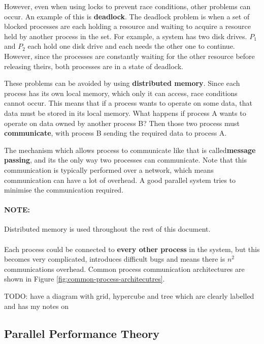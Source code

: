 \documentclass{article}
\begin{document}
However, even when using locks to prevent race conditions, other problems can occur. An example of this is \textbf{deadlock}. The deadlock problem is when a set of blocked processes are each holding a resource and waiting to acquire a resource held by another process in the set. For example, a system has two disk drives. $P_1$ and $P_2$ each hold one disk drive and each needs the other one to continue. However, since the processes are constantly waiting for the other resource before releasing theirs, both processes are in a state of deadlock.

These problems can be avoided by using \textbf{distributed memory}. Since each process has its own local memory, which only it can access, race conditions cannot occur. This means that if a process wants to operate on some data, that data must be stored in its local memory. What happens if process A wants to operate on data owned by another process B? Then those two process must \textbf{communicate}, with process B sending the required data to process A. 

The mechanism which allows process to communicate like that is called\textbf{message passing}, and its the only way two processes can communicate. Note that this communication is typically performed over a network, which means communication can have a lot of overhead.  A good parallel system tries to minimise the communication required.

\paragraph{\textbf{NOTE:}} Distributed memory is used throughout the rest of this document.

\paragraph{}

Each process could be connected to \textbf{every other process} in the system, but this becomes very complicated, introduces difficult bugs and means there is $n^2$ communications overhead. Common process communication architectures are shown in Figure \ref{fig:common-process-architecutres}.

TODO: have a diagram with grid, hypercube and tree which are clearly labelled and has my notes on
	
\subsection{Parallel Performance Theory}
\end{document}
